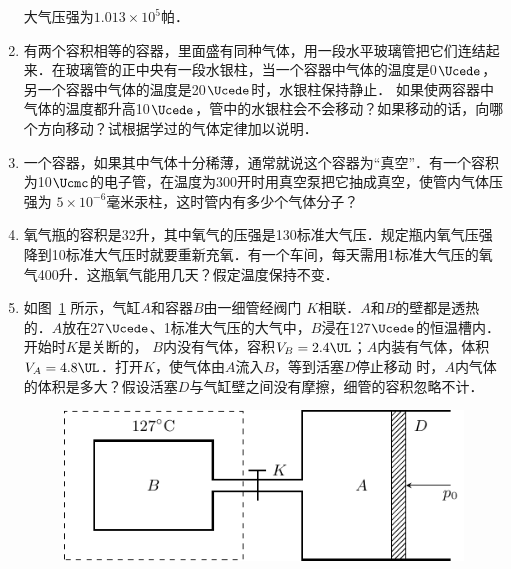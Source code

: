 \begin{enumerate}
大气压强为$1.013\times 10^5$帕．
\item  有两个容积相等的容器，里面盛有同种气体，用一段水平玻璃管把它们连结起来．在玻璃管的正中央有一段水银柱，当一个容器中气体的温度是0$\Ucede$，另一个容器中气体的温度是20$\Ucede$时，水银柱保持静止．
如果使两容器中气体的温度都升高10$\Ucede$，管中的水银柱会不会移动？如果移动的话，向哪个方向移动？试根据学过的气体定律加以说明．
\item  一个容器，如果其中气体十分稀薄，通常就说这个容器为“真空”．有一个容积为10$\Ucmc$的电子管，在温度为300开时用真空泵把它抽成真空，使管内气体压强为 $5\times 10^{-6}$毫米汞柱，这时管内有多少个气体分子？
\item  氧气瓶的容积是32升，其中氧气的压强是130标准大气压．规定瓶内氧气压强降到10标准大气压时就要重新充氧．有一个车间，每天需用1标准大气压的氧气400升．这瓶氧气能用几天？假定温度保持不变．



\item  如图~\ref{fig_B_3-16} 所示，气缸$A$和容器$B$由一细管经阀门
$K$相联．$A$和$B$的壁都是透热的．$A$放在27$\Ucede$、1标准大气压的大气中，$B$浸在127$\Ucede$的恒温槽内．开始时$K$是关断的，
$B$内没有气体，容积$V_B=2.4 \UL $；$A$内装有气体，体积$V_A=
4.8 \UL $．打开$K$，使气体由$A$流入$B$，等到活塞$D$停止移动
时，$A$内气体的体积是多大？假设活塞$D$与气缸壁之间没有摩擦，细管的容积忽略不计．
\begin{figure}[htbp]
	\centering
	\includegraphics{fig/B/3-16.pdf}
	\caption{}\label{fig_B_3-16}
\end{figure}

\end{enumerate}





